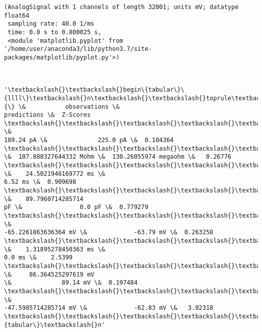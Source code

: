     

            \begin{tcolorbox}[breakable, size=fbox, boxrule=.5pt, pad at break*=1mm, opacityfill=0]
\begin{Verbatim}[commandchars=\\\{\}]
(AnalogSignal with 1 channels of length 32001; units mV; datatype float64
 sampling rate: 40.0 1/ms
 time: 0.0 s to 0.800025 s,
 <module 'matplotlib.pyplot' from '/home/user/anaconda3/lib/python3.7/site-
packages/matplotlib/pyplot.py'>)
\end{Verbatim}
\end{tcolorbox}
        
    \begin{center}
    \end{center}
    { \hspace*{\fill} \\}
    
            \begin{tcolorbox}[breakable, size=fbox, boxrule=.5pt, pad at break*=1mm, opacityfill=0]
\begin{Verbatim}[commandchars=\\\{\}]
'\textbackslash{}\textbackslash{}begin\{tabular\}\{llll\}\textbackslash{}n\textbackslash{}\textbackslash{}toprule\textbackslash{}n\{\} \&           observations \&
predictions \&  Z-Scores \textbackslash{}\textbackslash{}\textbackslash{}\textbackslash{}\textbackslash{}n\textbackslash{}\textbackslash{}midrule\textbackslash{}nRheobaseTest                   \&
189.24 pA \&              225.0 pA \&  0.104364 \textbackslash{}\textbackslash{}\textbackslash{}\textbackslash{}\textbackslash{}nInputResistanceTest
\&  107.080327644332 Mohm \&  130.26055974 megaohm \&   0.26776
\textbackslash{}\textbackslash{}\textbackslash{}\textbackslash{}\textbackslash{}nTimeConstantTest               \&    24.5021946169772 ms \&
6.52 ms \&  0.909698 \textbackslash{}\textbackslash{}\textbackslash{}\textbackslash{}\textbackslash{}nCapacitanceTest                \&    89.7960714285714
pF \&                0.0 pF \&  0.779279 \textbackslash{}\textbackslash{}\textbackslash{}\textbackslash{}\textbackslash{}nRestingPotentialTest           \&
-65.2261863636364 mV \&             -63.79 mV \&  0.263258
\textbackslash{}\textbackslash{}\textbackslash{}\textbackslash{}\textbackslash{}nInjectedCurrentAPWidthTest     \&    1.31895278450363 ms \&
0.0 ms \&    2.5399 \textbackslash{}\textbackslash{}\textbackslash{}\textbackslash{}\textbackslash{}nInjectedCurrentAPAmplitudeTest \&     86.364525297619 mV
\&              89.14 mV \&  0.197484 \textbackslash{}\textbackslash{}\textbackslash{}\textbackslash{}\textbackslash{}nInjectedCurrentAPThresholdTest \&
-47.5985714285714 mV \&             -62.83 mV \&   3.02318
\textbackslash{}\textbackslash{}\textbackslash{}\textbackslash{}\textbackslash{}n\textbackslash{}\textbackslash{}bottomrule\textbackslash{}n\textbackslash{}\textbackslash{}end\{tabular\}\textbackslash{}n'
\end{Verbatim}
\end{tcolorbox}
        
